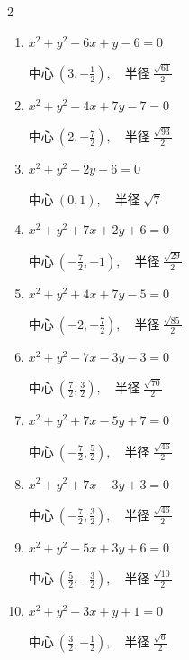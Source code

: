 \begin{multicols}{2}
\begin{enumerate}
        $\displaystyle 中心\: \left(1,-2\right), \quad 半径 \ 1$

  \item $x^{2}+y^{2}-6x+y-6=0$

        $\displaystyle 中心\: \left(3,-\frac{1}{2}\right), \quad 半径 \ \frac{\sqrt{61}}{2}$

  \item $x^{2}+y^{2}-4x+7y-7=0$

        $\displaystyle 中心\: \left(2,-\frac{7}{2}\right), \quad 半径 \ \frac{\sqrt{93}}{2}$

  \item $x^{2}+y^{2}-2y-6=0$

        $\displaystyle 中心\: \left(0,1\right), \quad 半径 \ \sqrt{7}$

  \item $x^{2}+y^{2}+7x+2y+6=0$

        $\displaystyle 中心\: \left(-\frac{7}{2},-1\right), \quad 半径 \ \frac{\sqrt{29}}{2}$

\columnbreak %

  \item $x^{2}+y^{2}+4x+7y-5=0$

        $\displaystyle 中心\: \left(-2,-\frac{7}{2}\right), \quad 半径 \ \frac{\sqrt{85}}{2}$

  \item $x^{2}+y^{2}-7x-3y-3=0$

        $\displaystyle 中心\: \left(\frac{7}{2},\frac{3}{2}\right), \quad 半径 \ \frac{\sqrt{70}}{2}$

  \item $x^{2}+y^{2}+7x-5y+7=0$

        $\displaystyle 中心\: \left(-\frac{7}{2},\frac{5}{2}\right), \quad 半径 \ \frac{\sqrt{46}}{2}$

  \item $x^{2}+y^{2}+7x-3y+3=0$

        $\displaystyle 中心\: \left(-\frac{7}{2},\frac{3}{2}\right), \quad 半径 \ \frac{\sqrt{46}}{2}$

  \item $x^{2}+y^{2}-5x+3y+6=0$

        $\displaystyle 中心\: \left(\frac{5}{2},-\frac{3}{2}\right), \quad 半径 \ \frac{\sqrt{10}}{2}$

  \item $x^{2}+y^{2}-3x+y+1=0$

        $\displaystyle 中心\: \left(\frac{3}{2},-\frac{1}{2}\right), \quad 半径 \ \frac{\sqrt{6}}{2}$


\end{enumerate}
\end{multicols}
